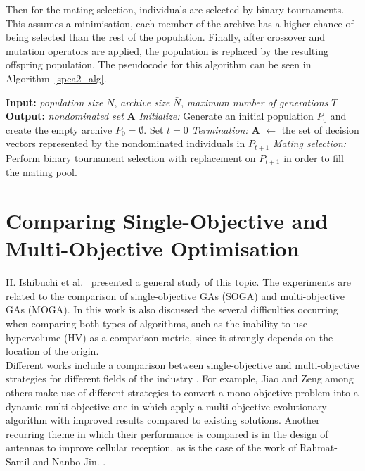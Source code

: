 Then for the mating selection, individuals are selected by binary tournaments. This assumes a minimisation, each member of the archive has a higher chance of being selected than the rest of the population. Finally, after crossover and mutation operators are applied, the population is replaced by the resulting offspring population. The pseudocode for this algorithm can be seen in Algorithm~\ref{spea2_alg}.\\

\begin{algorithm}[H]
\caption{SPEA2}
\label{spea2_alg}
\SetAlgoLined
\textbf{Input:} \textit{population size} $N$, \textit{archive size} $\bar N$, \textit{maximum number of generations} $T$\;
\textbf{Output:} \textit{nondominated set} \textbf{A}\;
\textit{Initialize:} Generate an initial population $P_0$ and create the empty archive $\bar P_0 = \emptyset.$ Set $t = 0$\;
\textit{Termination:} \textbf{A} $\gets$ the set of decision vectors represented by the nondominated individuals in $\bar P_{t+1}$\;
\textit{Mating selection:} Perform binary tournament selection with replacement on $\bar P_{t+1}$ in order to fill the mating pool.\
\end{algorithm}

\section{Comparing Single-Objective and Multi-Objective Optimisation}

H. Ishibuchi et al.~\cite{Ishibuchi_single_vs_multiobjective} presented a general study of this topic. The experiments are related to the comparison of single-objective GAs (SOGA) and multi-objective GAs (MOGA). In this work is also discussed the several difficulties occurring when comparing both types of algorithms, such as the inability to use hypervolume (HV) as a comparison metric, since it strongly depends on the location of the origin.\\

Different works include a comparison between single-objective and multi-objective strategies for different fields of the industry \cite{mehboob2016genetic,leal2018aero,shiau1994multiobjective}. For example, Jiao and Zeng \cite{Jiao2017DynamicME} among others make use of different strategies to convert a mono-objective problem into a dynamic multi-objective one in which apply a multi-objective evolutionary algorithm with improved results compared to existing solutions. Another recurring theme in which their performance is compared is in the design of antennas to improve cellular reception, as is the case of the work of Rahmat-Samil and Nanbo Jin. \cite{Jin2007-qu}.\\

